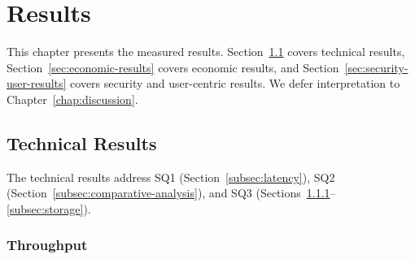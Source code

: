 
\chapter{Results}\label{chap:results}

This chapter presents the measured results. Section~\ref{sec:technical-results} covers technical results, Section~\ref{sec:economic-results} covers economic results, and Section~\ref{sec:security-user-results} covers security and user-centric results. We defer interpretation to Chapter~\ref{chap:discussion}.

\section{Technical Results}\label{sec:technical-results}

The technical results address SQ1 (Section~\ref{subsec:latency}), SQ2 (Section~\ref{subsec:comparative-analysis}), and SQ3 (Sections~\ref{subsec:throughput}--\ref{subsec:storage}).

\subsection{Throughput}\label{subsec:throughput}


